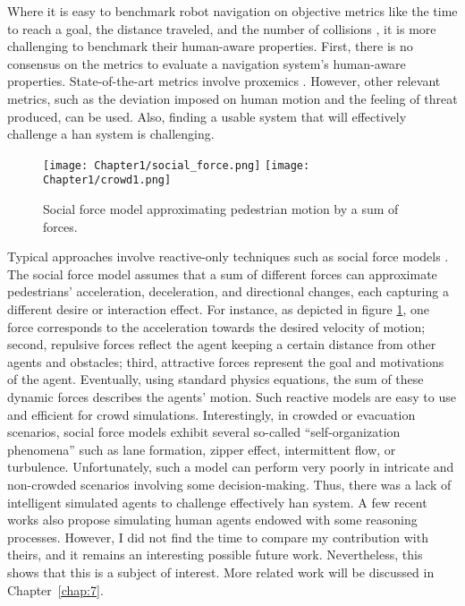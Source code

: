 Where it is easy to benchmark robot navigation on objective metrics like the time to reach a goal, the distance traveled, and the number of collisions \cite{perille2020benchmarking}, it is more challenging to benchmark their human-aware properties.
First, there is no consensus on the metrics to evaluate a navigation system's human-aware properties. State-of-the-art metrics involve proxemics \cite{samarakoon2022review}. However, other relevant metrics, such as the deviation imposed on human motion and the feeling of threat produced, can be used.
Also, finding a usable system that will effectively challenge a \acrfull{han} system is challenging. 

\begin{figure}
    \center
    \texttt{[image: Chapter1/social\_force.png]}
    \texttt{[image: Chapter1/crowd1.png]}
    \caption{Social force model approximating pedestrian motion by a sum of forces.}
    \label{fig:social_force_model}
\end{figure}

Typical approaches involve reactive-only techniques such as social force models \cite{helbing1995social,chen_social_2018}. 
The social force model assumes that a sum of different forces can approximate pedestrians' acceleration, deceleration, and directional changes, each capturing a different desire or interaction effect. For instance, as depicted in figure \ref{fig:social_force_model}, one force corresponds to the acceleration towards the desired velocity of motion; second, repulsive forces reflect the agent keeping a certain distance from other agents and obstacles; third, attractive forces represent the goal and motivations of the agent. Eventually, using standard physics equations, the sum of these dynamic forces describes the agents' motion.
Such reactive models are easy to use and efficient for crowd simulations. Interestingly, in crowded or evacuation scenarios, social force models exhibit several so-called ``self-organization phenomena'' such as lane formation, zipper effect, intermittent flow, or turbulence.
Unfortunately, such a model can perform very poorly in intricate and non-crowded scenarios involving some decision-making. Thus, there was a lack of intelligent simulated agents to challenge effectively \acrshort{han} system.
A few recent works also propose simulating human agents endowed with some reasoning processes. However, I did not find the time to compare my contribution with theirs, and it remains an interesting possible future work. Nevertheless, this shows that this is a subject of interest. More related work will be discussed in Chapter~\ref{chap:7}.
